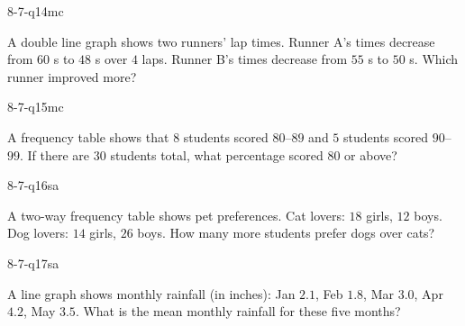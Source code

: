 \begin{practiceQuestion}{8-7-q14}{mc}
\begin{questionText}
A double line graph shows two runners' lap times. Runner A's times decrease from $60$ s to $48$ s over $4$ laps. Runner B's times decrease from $55$ s to $50$ s. Which runner improved more?
\end{questionText}
\end{practiceQuestion}

\begin{practiceQuestion}{8-7-q15}{mc}
\begin{questionText}
A frequency table shows that $8$ students scored $80$--$89$ and $5$ students scored $90$--$99$. If there are $30$ students total, what percentage scored $80$ or above?
\end{questionText}
\end{practiceQuestion}


\begin{practiceQuestion}{8-7-q16}{sa}
\begin{questionText}
A two-way frequency table shows pet preferences. Cat lovers: $18$ girls, $12$ boys. Dog lovers: $14$ girls, $26$ boys. How many more students prefer dogs over cats?
\end{questionText}
\end{practiceQuestion}

\begin{practiceQuestion}{8-7-q17}{sa}
\begin{questionText}
A line graph shows monthly rainfall (in inches): Jan $2.1$, Feb $1.8$, Mar $3.0$, Apr $4.2$, May $3.5$. What is the mean monthly rainfall for these five months?
\end{questionText}
\end{practiceQuestion}


